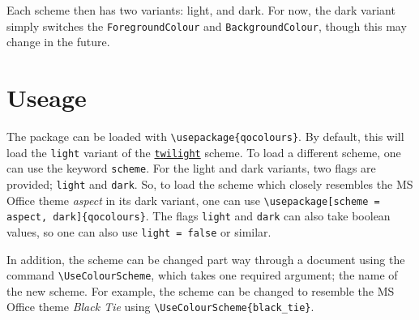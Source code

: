 \documentclass[]{article}
\begin{document}
  Each scheme then has two variants: light, and dark. For now, the dark variant simply switches the \texttt{ForegroundColour} and \texttt{BackgroundColour}, though this may change in the future.

  \section{Useage}

  The package can be loaded with \verb|\usepackage{qocolours}|. By default, this will load the \texttt{light} variant of the \hyperref[section:default]{\texttt{twilight}} scheme. To load a different scheme, one can use the keyword \texttt{scheme}. For the light and dark variants, two flags are provided; \texttt{light} and \texttt{dark}. So, to load the scheme which closely resembles the MS Office theme \textit{aspect} in its dark variant, one can use \verb|\usepackage[scheme = aspect, dark]{qocolours}|. The flags \texttt{light} and \texttt{dark} can also take boolean values, so one can also use \verb|light = false| or similar.

  In addition, the scheme can be changed part way through a document using the command \verb|\UseColourScheme|, which takes one required argument; the name of the new scheme. For example, the scheme can be changed to resemble the MS Office theme \textit{Black Tie} using \verb|\UseColourScheme{black_tie}|.
\end{document}
